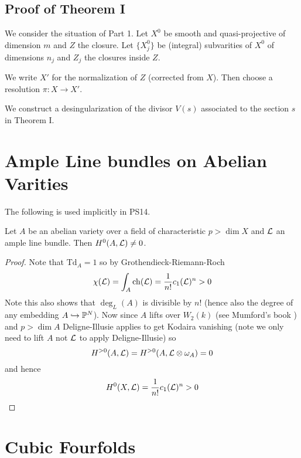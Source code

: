 \documentclass[12pt]{article}
\begin{document}
\subsection{Proof of Theorem I}

We consider the situation of Part 1. Let $X^0$ be smooth and quasi-projective of dimension $m$ and $Z$ the closure. Let $\{ X_j^0 \}$ be (integral) subvarities of $X^0$ of dimensions $n_j$ and $Z_j$ the closures inside $Z$. 
\par 
We write $X'$ for the normalization of $Z$ {\color{red} (corrected from $X$)}. Then choose a resolution $\pi : X \to X'$. 
\par 
We construct a desingularization of the divisor $V(s)$ associated to the section $s$ in Theorem I. 

\section{Ample Line bundles on Abelian Varities}

The following is used implicitly in PS14.

\newcommand{\Td}{\mathrm{Td}}

\begin{prop}
Let $A$ be an abelian variety over a field of characteristic $p > \dim{X}$ and $\mathcal{L}$ an ample line bundle. Then $H^0(A, \mathcal{L}) \neq 0$.
\end{prop}

\begin{proof}
Note that $\Td_A = 1$ so by Grothendieck-Riemann-Roch
\[ \chi(\mathcal{L}) = \int_A \mathrm{\mathrm{ch}}(\mathcal{L}) = \frac{1}{n!} c_1(\mathcal{L})^n > 0 \]
Note this also shows that $\deg_L(A)$ is divisible by $n!$ (hence also the degree of any embedding $A \hookrightarrow \mathbb{P}^N$). Now since $A$ lifts over $W_2(k)$ (see Mumford's book ) and $p > \dim{A}$ Deligne-Illusie applies to get Kodaira vanishing (note we only need to lift $A$ not $\mathcal{L}$ to apply Deligne-Illusie) so 
\[ H^{>0}(A, \mathcal{L}) = H^{>0}(A, \mathcal{L} \otimes \omega_A) = 0 \]
and hence
\[ H^0(X, \mathcal{L}) = \frac{1}{n!} c_1(\mathcal{L})^n > 0 \]
\end{proof}



\section{Cubic Fourfolds}
\end{document}
